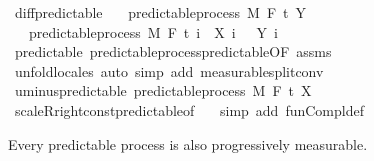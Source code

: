 \begin{isabellebody}
\endisatagproof
{\isafoldproof}%
%
\isadelimproof
\isanewline
%
\endisadelimproof
\isanewline
{}\isamarkupfalse%
\ diff{\isacharunderscore}{\kern0pt}predictable{\isacharcolon}{\kern0pt}\isanewline
\ \ \ {\isachardoublequoteopen}predictable{\isacharunderscore}{\kern0pt}process\ M\ F\ t\ Y{\isachardoublequoteclose}\isanewline
\ \ \ {\isachardoublequoteopen}predictable{\isacharunderscore}{\kern0pt}process\ M\ F\ t\ {\isacharparenleft}{\kern0pt}{\isasymlambda}i\ {\isasymxi}{\isachardot}{\kern0pt}\ X\ i\ {\isasymxi}\ {\isacharminus}{\kern0pt}\ Y\ i\ {\isasymxi}{\isacharparenright}{\kern0pt}{\isachardoublequoteclose}\isanewline
%
\isadelimproof
\ \ %
\endisadelimproof
%
\isatagproof
{}\isamarkupfalse%
\ predictable\ predictable{\isacharunderscore}{\kern0pt}process{\isachardot}{\kern0pt}predictable{\isacharbrackleft}{\kern0pt}OF\ assms{\isacharbrackright}{\kern0pt}\ \isamarkupfalse%
\ {\isacharparenleft}{\kern0pt}unfold{\isacharunderscore}{\kern0pt}locales{\isacharparenright}{\kern0pt}\ {\isacharparenleft}{\kern0pt}auto\ simp\ add{\isacharcolon}{\kern0pt}\ measurable{\isacharunderscore}{\kern0pt}split{\isacharunderscore}{\kern0pt}conv{\isacharparenright}{\kern0pt}%
\endisatagproof
{\isafoldproof}%
%
\isadelimproof
\isanewline
%
\endisadelimproof
\isanewline
{}\isamarkupfalse%
\ uminus{\isacharunderscore}{\kern0pt}predictable{\isacharcolon}{\kern0pt}\ {\isachardoublequoteopen}predictable{\isacharunderscore}{\kern0pt}process\ M\ F\ t\ {\isacharparenleft}{\kern0pt}{\isacharminus}{\kern0pt}X{\isacharparenright}{\kern0pt}{\isachardoublequoteclose}%
\isadelimproof
\ %
\endisadelimproof
%
\isatagproof
{}\isamarkupfalse%
\ scaleR{\isacharunderscore}{\kern0pt}right{\isacharunderscore}{\kern0pt}const{\isacharprime}{\kern0pt}{\isacharunderscore}{\kern0pt}predictable{\isacharbrackleft}{\kern0pt}of\ {\isachardoublequoteopen}{\isacharminus}{\kern0pt}{}{\isachardoublequoteclose}{\isacharbrackright}{\kern0pt}\ \isamarkupfalse%
\ {\isacharparenleft}{\kern0pt}simp\ add{\isacharcolon}{\kern0pt}\ fun{\isacharunderscore}{\kern0pt}Compl{\isacharunderscore}{\kern0pt}def{\isacharparenright}{\kern0pt}%
\endisatagproof
{\isafoldproof}%
%
\isadelimproof
%
\endisadelimproof
\isanewline
\isanewline
{}\isamarkupfalse%
%
\begin{isamarkuptext}%
Every predictable process is also progressively measurable.%
\end{isamarkuptext}\isamarkuptrue%

\end{isabellebody}
